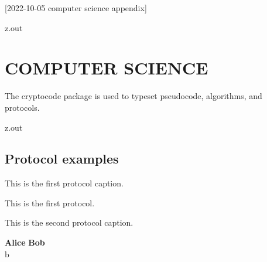 [2022-10-05 computer science appendix]

\begin{VerbatimOut}{z.out}
\chapter{COMPUTER SCIENCE}

The cryptocode package
\cite{mittelbach2020}
%
is used to typeset pseudocode,
algorithms,
and protocols.
\end{VerbatimOut}

\MyIO


\begin{VerbatimOut}{z.out}


\section{Protocol examples}

\begin{protocol}[ht]
  \caption{This is the first protocol caption.}
  This is the first protocol.
\end{protocol}

\begin{protocol}[ht]
  \caption{This is the second protocol caption.}
  \pseudocodeblock
  {
    \textbf{Alice} \> \> \textbf{Bob}\\
    b \sample \bin \> \>\\
    \>  \> \\
    \> \> 
  }
\end{protocol}
\end{VerbatimOut}

\MyIO
